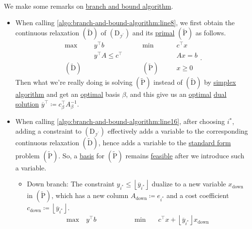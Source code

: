 \begin{remark}
	We make some remarks on \hyperref[algo:branch-and-bound-algorithm]{branch and bound algorithm}.
	\begin{itemize}
		\item When calling \autoref{algo:branch-and-bound-algorithm:line8}, we first obtain the continuous relaxation \((\widetilde{\mathrm{D}})\) of \((\mathrm{D}_{\mathcal{I} ^\prime })\) and its \hyperref[def:primal]{primal} \((\widetilde{\mathrm{P}} )\) as follows.
		      \[
			      \begin{alignedat}{5}
				      \max ~&y^{\top}b\qquad\qquad	&&\min~		&&c^{\top}x\\
				      &y^{\top}A\leq c^{\top} 		&&			&&Ax = b\\
				      (\widetilde{\mathrm{D}})\quad	& 				&&(\widetilde{\mathrm{P}})\quad	&&x\geq  0
			      \end{alignedat}.
		      \]
		      Then what we're really doing is solving \((\widetilde{\mathrm{P}})\) instead of \((\widetilde{\mathrm{D}} )\) by \hyperref[algo:simplex-algorithm]{simplex algorithm} and get an \hyperref[def:optimal-solution]{optimal} basis \(\beta\), and this give us an \hyperref[def:optimal-solution]{optimal} \hyperref[def:dual-basic-solution]{dual solution} \(\overline{y}^{\top}\coloneqq c^{\top}_{\beta}A^{-1} _{\beta}\).
		\item When calling \autoref{algo:branch-and-bound-algorithm:line16}, after choosing \(i^{\ast} \), adding a constraint to \((\mathrm{D}_{\mathcal{I} ^\prime })\) effectively adds a variable to the corresponding continuous relaxation \((\widetilde{\mathrm{D}})\), hence adds a variable to the \hyperref[def:standard-form]{standard form} problem \((\widetilde{\mathrm{P}} )\). So, a \hyperref[def:basis]{basis} for \((\widetilde{\mathrm{P}})\) remains \hyperref[def:feasible-solution]{feasible} after we introduce such a variable.
		      \begin{itemize}
			      \item\label{rmk:down-branch} Down branch: The constraint \(y_{i^{\ast}} \leq \left\lfloor \overline{y}_{i^{\ast}} \right\rfloor\) dualize to a new variable \(x_{\text{down}}\) in \((\widetilde{\mathrm{P}})\), which has a new column \(A_{\text{down}}\coloneqq e_{i^{\ast}}\) and a cost coefficient \(c_{\text{down}}\coloneqq \left\lfloor \overline{y} _{i^{\ast}}\right\rfloor \).
			      \[
				      \begin{alignedat}{5}
					      \max ~	&y^{\top}b\qquad\qquad				&&\min~	&&c^{\top}x+\left\lfloor \overline{y}_{i^{\ast}} \right\rfloor x_{\text{down}}\\

\end{alignedat}\]
\end{itemize}
\end{itemize}
\end{remark}
